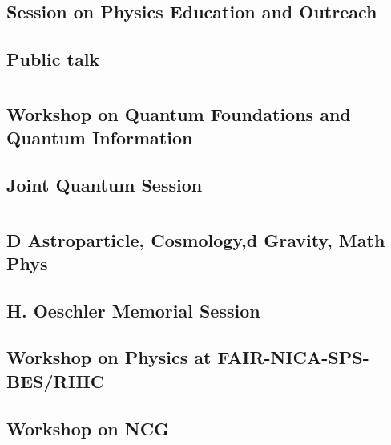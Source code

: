 \subsection{Session on Physics Education  and Outreach}

\clearpage

\subsection{Public talk}

\clearpage

\section{}
\subsection{Workshop on Quantum Foundations and Quantum Information}

\clearpage

\subsection{Joint Quantum Session}

\clearpage

\section{}
\subsection{D Astroparticle, Cosmology,d Gravity, Math Phys}

\clearpage

\subsection{H. Oeschler Memorial Session}

\clearpage

\subsection{Workshop on Physics at FAIR-NICA-SPS-BES/RHIC}

\clearpage

\subsection{Workshop on NCG}

\clearpage

